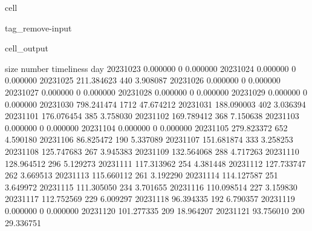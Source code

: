 \documentclass[letterpaper,10pt,english]{jupyterBook}
\begin{document}
\begin{sphinxuseclass}{cell}
\begin{sphinxuseclass}{tag_remove-input}\begin{sphinxVerbatimOutput}

\begin{sphinxuseclass}{cell_output}
\begin{sphinxVerbatim}[commandchars=\\\{\}]
                  size  number  timeliness
day                                       
2023\PYGZhy{}10\PYGZhy{}23    0.000000       0    0.000000
2023\PYGZhy{}10\PYGZhy{}24    0.000000       0    0.000000
2023\PYGZhy{}10\PYGZhy{}25  211.384623     440    3.908087
2023\PYGZhy{}10\PYGZhy{}26    0.000000       0    0.000000
2023\PYGZhy{}10\PYGZhy{}27    0.000000       0    0.000000
2023\PYGZhy{}10\PYGZhy{}28    0.000000       0    0.000000
2023\PYGZhy{}10\PYGZhy{}29    0.000000       0    0.000000
2023\PYGZhy{}10\PYGZhy{}30  798.241474    1712   47.674212
2023\PYGZhy{}10\PYGZhy{}31  188.090003     402    3.036394
2023\PYGZhy{}11\PYGZhy{}01  176.076454     385    3.758030
2023\PYGZhy{}11\PYGZhy{}02  169.789412     368    7.150638
2023\PYGZhy{}11\PYGZhy{}03    0.000000       0    0.000000
2023\PYGZhy{}11\PYGZhy{}04    0.000000       0    0.000000
2023\PYGZhy{}11\PYGZhy{}05  279.823372     652    4.590180
2023\PYGZhy{}11\PYGZhy{}06   86.825472     190    5.337089
2023\PYGZhy{}11\PYGZhy{}07  151.681874     333    3.258253
2023\PYGZhy{}11\PYGZhy{}08  125.747683     267    3.945383
2023\PYGZhy{}11\PYGZhy{}09  132.564068     288    4.717263
2023\PYGZhy{}11\PYGZhy{}10  128.964512     296    5.129273
2023\PYGZhy{}11\PYGZhy{}11  117.313962     254    4.381448
2023\PYGZhy{}11\PYGZhy{}12  127.733747     262    3.669513
2023\PYGZhy{}11\PYGZhy{}13  115.660112     261    3.192290
2023\PYGZhy{}11\PYGZhy{}14  114.127587     251    3.649972
2023\PYGZhy{}11\PYGZhy{}15  111.305050     234    3.701655
2023\PYGZhy{}11\PYGZhy{}16  110.098514     227    3.159830
2023\PYGZhy{}11\PYGZhy{}17  112.752569     229    6.009297
2023\PYGZhy{}11\PYGZhy{}18   96.394335     192    6.790357
2023\PYGZhy{}11\PYGZhy{}19    0.000000       0    0.000000
2023\PYGZhy{}11\PYGZhy{}20  101.277335     209   18.964207
2023\PYGZhy{}11\PYGZhy{}21   93.756010     200   29.336751
\end{sphinxVerbatim}

\end{sphinxuseclass}\end{sphinxVerbatimOutput}

\end{sphinxuseclass}
\end{sphinxuseclass}
\sphinxstepscope
\end{document}

